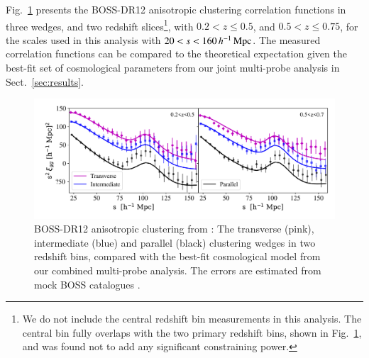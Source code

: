 Fig.~\ref{fig:wedges} presents the \citet{sanchez/etal:2017} BOSS-DR12 anisotropic clustering correlation functions in three wedges, and two redshift slices\footnote{We do not include the \citet{sanchez/etal:2017} central redshift bin measurements in this analysis.  The central bin fully overlaps with the two primary redshift bins, shown in Fig.~\ref{fig:wedges}, and was found not to add any significant constraining power.}, with $0.2<z\leq0.5$, and $0.5<z\leq0.75$, for the scales used in this analysis with $20  < s < 160\, h^{-1}\, {\rm Mpc}$.   The measured correlation functions can be compared to the theoretical expectation given the best-fit set of cosmological parameters from our joint multi-probe analysis in Sect.~\ref{sec:results}.

\begin{figure}
        \includegraphics[width=\textwidth]{Data_Plots/clustering_wedges/BOSS_Sanchez_wedges.pdf}
        \caption{BOSS-DR12 anisotropic clustering from \citet{sanchez/etal:2017}:
          The transverse (pink), intermediate (blue) and parallel
          (black) clustering wedges in two redshift bins, compared 
          with the best-fit
          cosmological model from our combined multi-probe analysis.  The errors are estimated from mock BOSS catalogues \citep{kitaura/etal:2016}. }
        \label{fig:wedges}
\end{figure}

